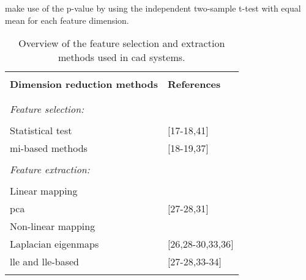 \cite{Niaf2011,Niaf2012} make use of the p-value by using the independent two-sample t-test with equal mean for each feature dimension. %
%
%
\begin{table}
	\caption{Overview of the feature selection and extraction methods used in \ac{cad} systems.}
	\small
	\begin{tabular}{p{.65\linewidth} p{.25\linewidth}}
		\hline \\ [-1.5ex]
		\textbf{Dimension reduction methods} & \textbf{References} \\ \\ [-1.5ex]
		\hline \\ [-1.5ex]
		\textit{Feature selection:} & \\ \\ [-1.5ex]
		\quad Statistical test & $[$17-18,41$]$ \\
		\quad \ac{mi}-based methods & $[$18-19,37$]$ \\ \\ [-1.5ex]
		\textit{Feature extraction:} & \\ \\ [-1.5ex]
		\quad Linear mapping & \\
		\quad \quad \acs{pca} & $[$27-28,31$]$ \\
		\quad Non-linear mapping & \\
		\quad \quad Laplacian eigenmaps & $[$26,28-30,33,36$]$ \\
		\quad \quad \acs{lle} and \acs{lle}-based & $[$27-28,33-34$]$ \\ \\ [-1.5ex]
		\hline
	\end{tabular}
	\label{tab:featext}
\end{table} 
